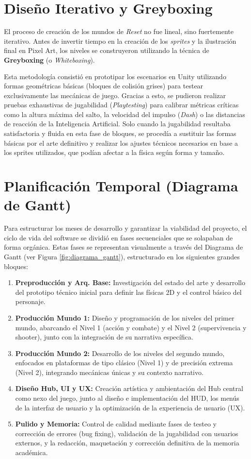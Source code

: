 \section{Diseño Iterativo y Greyboxing}
El proceso de creación de los mundos de \textit{Reset} no fue lineal, sino fuertemente iterativo. Antes de invertir tiempo en la creación de los \textit{sprites} y la ilustración final en Pixel Art, los niveles se construyeron utilizando la técnica de \textbf{Greyboxing} \cite{greyboxing} (o \textit{Whiteboxing}). 

Esta metodología consistió en prototipar los escenarios en Unity utilizando formas geométricas básicas (bloques de colisión grises) para testear exclusivamente las mecánicas de juego. Gracias a esto, se pudieron realizar pruebas exhaustivas de jugabilidad (\textit{Playtesting}) para calibrar métricas críticas como la altura máxima del salto, la velocidad del impulso (\textit{Dash}) o las distancias de reacción de la Inteligencia Artificial. Solo cuando la jugabilidad resultaba satisfactoria y fluida en esta fase de bloques, se procedía a sustituir las formas básicas por el arte definitivo y realizar los ajustes técnicos necesarios en base a los sprites utilizados, que podían afectar a la física según forma y tamaño.

\section{Planificación Temporal (Diagrama de Gantt)}
Para estructurar los meses de desarrollo y garantizar la viabilidad del proyecto, el ciclo de vida del software se dividió en fases secuenciales que se solapaban de forma orgánica. Estas fases se representan visualmente a través del Diagrama de Gantt (ver Figura \ref{fig:diagrama_gantt}), estructurado en los siguientes grandes bloques:

\begin{enumerate}
    \item \textbf{Preproducción y Arq. Base:} Investigación del estado del arte y desarrollo del prototipo técnico inicial para definir las físicas 2D y el control básico del personaje.
    \item \textbf{Producción Mundo 1:} Diseño y programación de los niveles del primer mundo, abarcando el Nivel 1 (acción y combate) y el Nivel 2 (supervivencia y shooter), junto con la integración de su narrativa específica.
    \item \textbf{Producción Mundo 2:} Desarrollo de los niveles del segundo mundo, enfocados en plataformas de tipo clásico (Nivel 1) y de precisión extrema (Nivel 2), integrando mecánicas únicas y su contexto narrativo.
    \item \textbf{Diseño Hub, UI y UX:} Creación artística y ambientación del Hub central como nexo del juego, junto al diseño e implementación del HUD, los menús de la interfaz de usuario y la optimización de la experiencia de usuario (UX).
    \item \textbf{Pulido y Memoria:} Control de calidad mediante fases de testeo y corrección de errores (bug fixing), validación de la jugabilidad con usuarios externos, y la redacción, maquetación y corrección definitiva de la memoria académica.
\end{enumerate}

